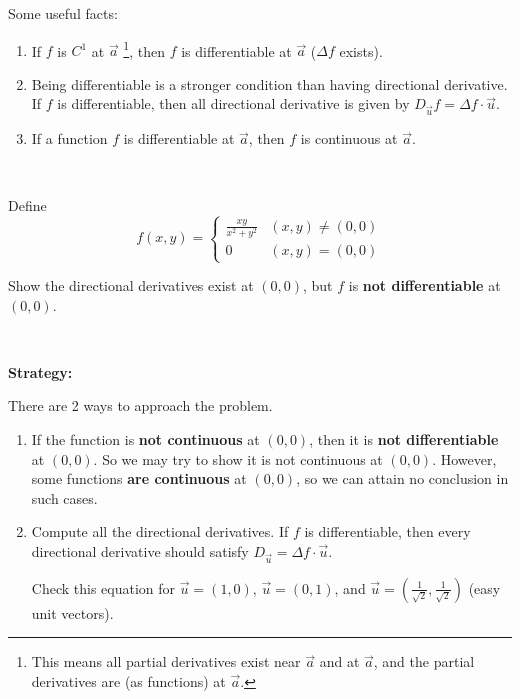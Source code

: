\documentclass[11pt,fleqn]{book} %
\begin{document}
Some useful facts:

\begin{enumerate}
    \item If $f$ is $C^1$ at $\vec{a}$ \footnote{This means all partial derivatives exist near $\vec{a}$ and at $\vec{a}$, and the partial derivatives are  (as functions) at $\vec{a}$. }, then $f$ is differentiable at $\vec{a}$ ($\Delta f$ exists). 

    \item Being differentiable is a stronger condition than having directional derivative. If $f$ is differentiable, then all directional derivative is given by $D_{\vec{u}} f = \Delta f \cdot \vec{u}$. 

    \item If a function $f$ is differentiable at $\vec{a}$, then $f$ is continuous at $\vec{a}$.
\end{enumerate}

{~~~}

\begin{exercise}
    Define $$f(x, y) = \begin{cases}
        \frac{xy}{x^2 + y^2} & (x, y) \neq (0, 0) \\
        0                    & (x, y) = (0, 0)
    \end{cases}$$

    Show the directional derivatives exist at $(0, 0)$, but $f$ is \textbf{not differentiable} at $(0, 0)$.

    {~~~}

    \textbf{Strategy:}
    
    There are 2 ways to approach the problem.

    \begin{enumerate}
        \item If the function is \textbf{not continuous} at $(0, 0)$, then it is \textbf{not differentiable} at $(0, 0)$. So we may try to show it is not continuous at $(0, 0)$. However, some functions \textbf{are continuous} at $(0, 0)$, so we can attain no conclusion in such cases.

        \item Compute all the directional derivatives. If $f$ is differentiable, then every directional derivative should satisfy $D_{\vec{u}} = \Delta f \cdot \vec{u}$. 
        
        Check this equation for $\vec{u} = (1, 0)$, $\vec{u} = (0, 1)$, and $\vec{u} = \left( \frac{1}{\sqrt{2}}, \frac{1}{\sqrt{2}} \right)$ (easy unit vectors). 
    \end{enumerate}
\end{exercise}
\end{document}
